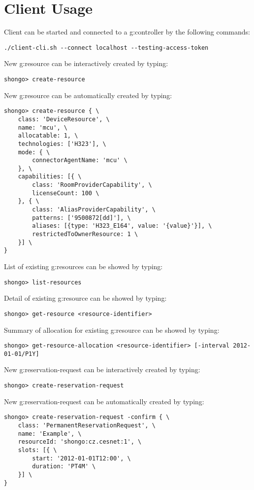 \appendix



\chapter{Client Usage}

Client can be started and connected to a \gls{g:controller} by the following commands:
\begin{verbatim}
./client-cli.sh --connect localhost --testing-access-token
\end{verbatim}
New \gls{g:resource} can be interactively created by typing:
\begin{verbatim}
shongo> create-resource
\end{verbatim}
New \gls{g:resource} can be automatically created by typing:
\begin{verbatim}
shongo> create-resource { \
    class: 'DeviceResource', \
    name: 'mcu', \
    allocatable: 1, \
    technologies: ['H323'], \
    mode: { \
        connectorAgentName: 'mcu' \
    }, \
    capabilities: [{ \
        class: 'RoomProviderCapability', \
        licenseCount: 100 \
    }, { \
        class: 'AliasProviderCapability', \
        patterns: ['9500872[dd]'], \
        aliases: [{type: 'H323_E164', value: '{value}'}], \
        restrictedToOwnerResource: 1 \
    }] \
}
\end{verbatim}
List of existing \glspl{g:resource} can be showed by typing:
\begin{verbatim}
shongo> list-resources
\end{verbatim}
Detail of existing \gls{g:resource} can be showed by typing:
\begin{verbatim}
shongo> get-resource <resource-identifier>
\end{verbatim}
Summary of allocation for existing \gls{g:resource} can be showed by typing:
\begin{verbatim}
shongo> get-resource-allocation <resource-identifier> [-interval 2012-01-01/P1Y]
\end{verbatim}
New \gls{g:reservation-request} can be interactively created by typing:
\begin{verbatim}
shongo> create-reservation-request
\end{verbatim}
New \gls{g:reservation-request} can be automatically created by typing:
\begin{verbatim}
shongo> create-reservation-request -confirm { \
    class: 'PermanentReservationRequest', \
    name: 'Example', \
    resourceId: 'shongo:cz.cesnet:1', \
    slots: [{ \
        start: '2012-01-01T12:00', \
        duration: 'PT4M' \
    }] \
}
\end{verbatim}
